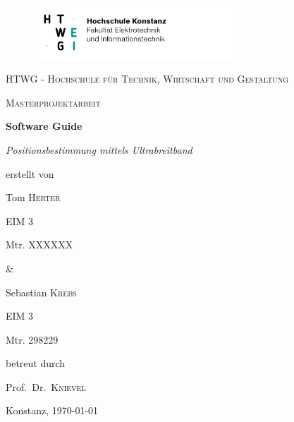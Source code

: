 \begin{titlepage}
    \begin{figure}[!tbp]
        \centering
        \begin{minipage}[b]{0.55\linewidth}
            \includegraphics[height=2cm]{pictures/HTWG_logo.png}
        \end{minipage}%
        \hfill%
        \begin{minipage}[b]{0.4\linewidth}
            \hfill%
        \end{minipage}%
    \end{figure}
    \centering
    {\scshape\Large HTWG - Hochschule für Technik, Wirtschaft und Gestaltung \par}
    \vspace{1cm}
    {\scshape\LARGE Masterprojektarbeit\par}
    \vspace{1.5cm}
    {\huge\bfseries Software Guide\par}
    \vspace{2cm}
    {\Large\itshape Positionsbestimmung mittels Ultrabreitband \par}
    \vfill
    erstellt von\par
    Tom \textsc{Herter}\par
    EIM 3\par
    Mtr. XXXXXX\par
    \&\par
    Sebastian \textsc{Krebs}\par
    EIM 3\par
    Mtr. 298229\par
    \vfill
    betreut durch\par
    Prof.\ Dr.~\textsc{Knievel}
    \vfill
	{\large Konstanz, \today\par}
\end{titlepage}
